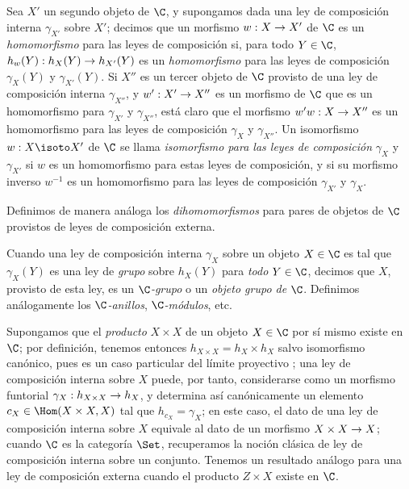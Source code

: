 \documentclass[oneside]{amsart}
\makeatletter
\newcommand{\ega@arrow}[2]{\mathchoice{#1}{#2}{#2}{#2}}
\renewcommand{\to}{\ega@arrow{\longrightarrow}{\rightarrow}}
\newcommand{\oldpage}[2][]{{\marginnote{\normalfont\textbf{#1}~|~#2}}\ignorespaces}
\let\EGAOriginalLabel\label
\renewcommand{\label}[1]{\phantomsection\EGAOriginalLabel{#1}}
\makeatother
\begin{document}
\begin{env}[8.2.2]
\label{0.8.2.2}
Sea $X'$ un segundo objeto de $\C$, y supongamos dada una ley de composición interna $\gamma_{X'}$ sobre $X'$; decimos que un morfismo $w:X\to X'$ de $\C$ es un \emph{homomorfismo} para las leyes de composición si, para todo $Y\in\C$, $h_w(Y):h_X(Y)\to h_{X'}(Y)$ es un \emph{homomorfismo} para las leyes de composición $\gamma_X(Y)$ y $\gamma_{X'}(Y)$.
Si $X''$ es un tercer
\oldpage[0\textsubscript{III}]{10}
objeto de $\C$ provisto de una ley de composición interna $\gamma_{X''}$, y $w':X'\to X''$ es un morfismo de $\C$ que es un homomorfismo para $\gamma_{X'}$ y $\gamma_{X''}$, está claro que el morfismo $w'w:X\to X''$ es un homomorfismo para las leyes de composición $\gamma_X$ y $\gamma_{X''}$.
Un isomorfismo $w:X\isoto X'$ de $\C$ se llama \emph{isomorfismo para las leyes de composición} $\gamma_X$ y $\gamma_{X'}$ si $w$ es un homomorfismo para estas leyes de composición, y si su morfismo inverso $w^{-1}$ es un homomorfismo para las leyes de composición $\gamma_{X'}$ y $\gamma_X$.

Definimos de manera análoga los \emph{dihomomorfismos} para pares de objetos de $\C$ provistos de leyes de composición externa.
\end{env}

\begin{env}[8.2.3]
\label{0.8.2.3}
Cuando una ley de composición interna $\gamma_X$ sobre un objeto $X\in\C$ es tal que $\gamma_X(Y)$ es una ley de \emph{grupo} sobre $h_X(Y)$ para \emph{todo} $Y\in\C$, decimos que $X$, provisto de esta ley, es un \emph{$\C$-grupo} o un \emph{objeto grupo de $\C$}.
Definimos análogamente los \emph{$\C$-anillos}, \emph{$\C$-módulos}, etc.
\end{env}

\begin{env}[8.2.4]
\label{0.8.2.4}
Supongamos que el \emph{producto} $X\times X$ de un objeto $X\in\C$ por sí mismo existe en $\C$; por definición, tenemos entonces $h_{X\times X}=h_X\times h_X$ salvo isomorfismo canónico, pues es un caso particular del límite proyectivo ; una ley de composición interna sobre $X$ puede, por tanto, considerarse como un morfismo funtorial $\gamma_X:h_{X\times X}\to h_X$, y determina así canónicamente  un elemento $c_X\in\Hom(X\times X,X)$ tal que $h_{c_X}=\gamma_X$; en este caso, el dato de una ley de composición interna sobre $X$ equivale al dato de un morfismo $X\times X\to X$; cuando $\C$ es la categoría $\Set$, recuperamos la noción clásica de ley de composición interna sobre un conjunto.
Tenemos un resultado análogo para una ley de composición externa cuando el producto $Z\times X$ existe en $\C$.
\end{env}
\end{document}
